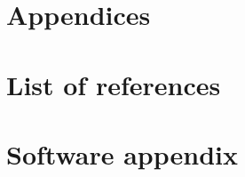 \chapter{Appendices}

\chapter{List of references}

\chapter{Software appendix}


\newpage
\listoffigures
{}
\newpage
\listoftables
{}
\newpage
\printbibliography

